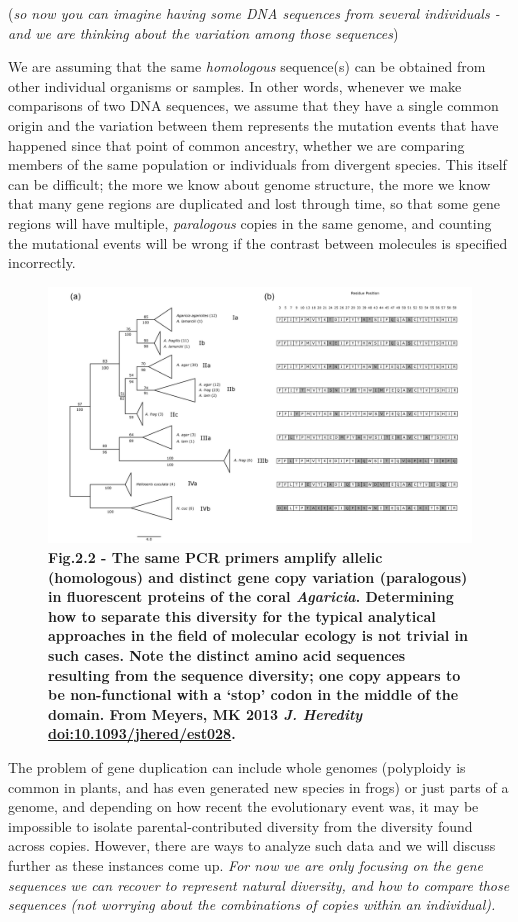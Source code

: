 \documentclass[
]{article}
\begin{document}
(\emph{so now you can imagine having some DNA sequences from several
individuals - and we are thinking about the variation among those
sequences})

We are assuming that the same \emph{homologous} sequence(s) can be
obtained from other individual organisms or samples. In other words,
whenever we make comparisons of two DNA sequences, we assume that they
have a single common origin and the variation between them represents
the mutation events that have happened since that point of common
ancestry, whether we are comparing members of the same population or
individuals from divergent species. This itself can be difficult; the
more we know about genome structure, the more we know that many gene
regions are duplicated and lost through time, so that some gene regions
will have multiple, \emph{paralogous} copies in the same genome, and
counting the mutational events will be wrong if the contrast between
molecules is specified incorrectly.

\begin{figure}
\centering
\includegraphics{MEImages/AgarFP.jpg}
\caption{\textbf{Fig.2.2 - The same PCR primers amplify allelic
(homologous) and distinct gene copy variation (paralogous) in
fluorescent proteins of the coral \emph{Agaricia}. Determining how to
separate this diversity for the typical analytical approaches in the
field of molecular ecology is not trivial in such cases. Note the
distinct amino acid sequences resulting from the sequence diversity; one
copy appears to be non-functional with a `stop' codon in the middle of
the domain. From Meyers, MK 2013 \emph{J. Heredity}
\url{doi:10.1093/jhered/est028}.}}
\end{figure}

The problem of gene duplication can include whole genomes (polyploidy is
common in plants, and has even generated new species in frogs) or just
parts of a genome, and depending on how recent the evolutionary event
was, it may be impossible to isolate parental-contributed diversity from
the diversity found across copies. However, there are ways to analyze
such data and we will discuss further as these instances come up.
\emph{For now we are only focusing on the gene sequences we can recover
to represent natural diversity, and how to compare those sequences (not
worrying about the combinations of copies within an individual).}
\end{document}
